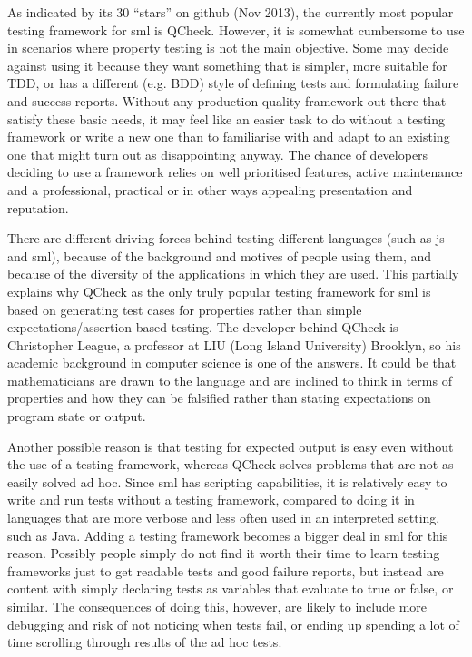 \documentclass[11pt]{article}
\begin{document}
As indicated by its 30 ``stars'' on github (Nov 2013), the currently most popular testing framework for \gls{sml} is QCheck. However, it is somewhat cumbersome to use in scenarios where property testing is not the main objective. Some may decide against using it because they want something that is simpler, more suitable for TDD, or has a different (e.g. BDD) style of defining tests and formulating failure and success reports. Without any production quality framework out there that satisfy these basic needs, it may feel like an easier task to do without a testing framework or write a new one than to familiarise with and adapt to an existing one that might turn out as disappointing anyway. The chance of developers deciding to use a framework relies on well prioritised features, active maintenance and a professional, practical or in other ways appealing presentation and reputation.

There are different driving forces behind testing different languages (such as \gls{js} and \gls{sml}), because of the background and motives of people using them, and because of the diversity of the applications in which they are used. This partially explains why QCheck as the only truly popular testing framework for \gls{sml} is based on generating test cases for properties rather than simple expectations/assertion based testing. The developer behind QCheck is Christopher League, a professor at LIU (Long Island University) Brooklyn, so his academic background in computer science is one of the answers. It could be that mathematicians are drawn to the language and are inclined to think in terms of properties and how they can be falsified rather than stating expectations on program state or output.

Another possible reason is that testing for expected output is easy even without the use of a testing framework, whereas QCheck solves problems that are not as easily solved ad hoc. Since \gls{sml} has scripting capabilities, it is relatively easy to write and run tests without a testing framework, compared to doing it in languages that are more verbose and less often used in an interpreted setting, such as Java. Adding a testing framework becomes a bigger deal in \gls{sml} for this reason. Possibly people simply do not find it worth their time to learn testing frameworks just to get readable tests and good failure reports, but instead are content with simply declaring tests as variables that evaluate to true or false, or similar. The consequences of doing this, however, are likely to include more debugging and risk of not noticing when tests fail, or ending up spending a lot of time scrolling through results of the ad hoc tests.
\end{document}
